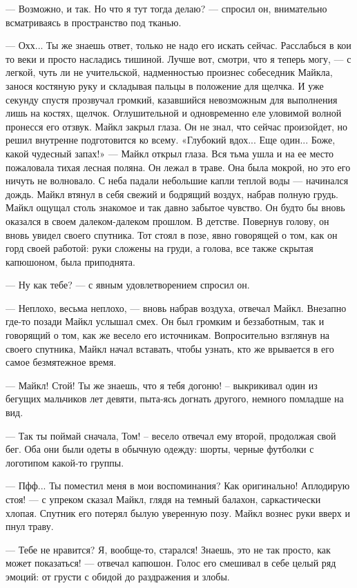 — Возможно, и так. Но что я тут тогда делаю? — спросил он, внимательно всматриваясь в пространство под тканью.

— Охх... Ты же знаешь ответ, только не надо его искать сейчас. Расслабься в кои то веки и просто насладись тишиной. Лучше вот, смотри, что я теперь могу, — с легкой, чуть ли не учительской, надменностью произнес собеседник Майкла, занося костяную руку и складывая пальцы в положение для щелчка. И уже секунду спустя прозвучал громкий, казавшийся невозможным для выполнения лишь на костях, щелчок. Оглушительной и одновременно еле уловимой волной пронесся его отзвук. Майкл закрыл глаза. Он не знал, что сейчас произойдет, но решил внутренне подготовится ко всему. «Глубокий вдох... Еще один... Боже, какой чудесный запах!» — Майкл открыл глаза. Вся тьма ушла и на ее место пожаловала тихая лесная поляна. Он лежал в траве. Она была мокрой, но это его ничуть не волновало. С неба падали небольшие капли теплой воды — начинался дождь. Майкл втянул в себя свежий и бодрящий воздух, набрав полную грудь. Майкл ощущал столь знакомое и так давно забытое чувство. Он будто бы вновь оказался в своем далеком-далеком прошлом. В детстве. Повернув голову, он вновь увидел своего спутника. Тот стоял в позе, явно говорящей о том, как он горд своей работой: руки сложены на груди, а голова, все также скрытая капюшоном, была приподнята.

— Ну как тебе? — с явным удовлетворением спросил он.

— Неплохо, весьма неплохо, — вновь набрав воздуха, отвечал Майкл. Внезапно где-то позади Майкл услышал смех. Он был громким и беззаботным, так и говорящий о том, как же весело его источникам. Вопросительно взглянув на своего спутника, Майкл начал вставать, чтобы узнать, кто же врывается в его самое безмятежное время.

— Майкл! Стой! Ты же знаешь, что я тебя догоню! – выкрикивал один из бегущих мальчиков лет девяти, пыта-ясь догнать другого, немного помладше на вид.

— Так ты поймай сначала, Том! – весело отвечал ему второй, продолжая свой бег. Оба они были одеты в обычную одежду: шорты, черные футболки с логотипом какой-то группы.

— Пфф... Ты поместил меня в мои воспоминания? Как оригинально! Аплодирую стоя! — с упреком сказал Майкл, глядя на темный балахон, саркастически хлопая. Спутник его потерял былую уверенную позу. Майкл вознес руки вверх и пнул траву.

— Тебе не нравится? Я, вообще-то, старался! Знаешь, это не так просто, как может показаться! — отвечал капюшон. Голос его смешивал в себе целый ряд эмоций: от грусти с обидой до раздражения и злобы.

